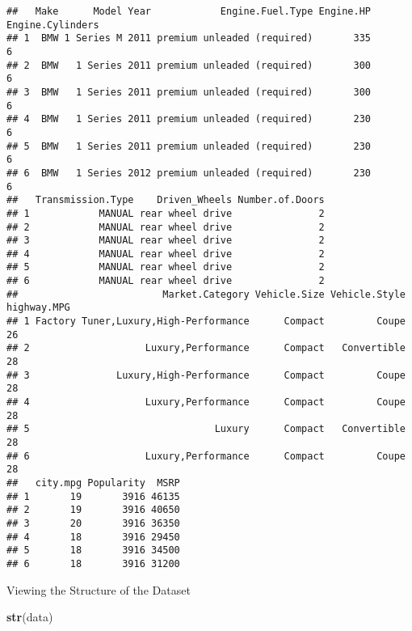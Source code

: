 \documentclass[
]{article}
\newenvironment{Shaded}{\begin{snugshade}}{\end{snugshade}}
\newcommand{\KeywordTok}[1]{\textcolor[rgb]{0.13,0.29,0.53}{\textbf{#1}}}
\newcommand{\NormalTok}[1]{#1}
\begin{document}
\begin{verbatim}
##   Make      Model Year            Engine.Fuel.Type Engine.HP Engine.Cylinders
## 1  BMW 1 Series M 2011 premium unleaded (required)       335                6
## 2  BMW   1 Series 2011 premium unleaded (required)       300                6
## 3  BMW   1 Series 2011 premium unleaded (required)       300                6
## 4  BMW   1 Series 2011 premium unleaded (required)       230                6
## 5  BMW   1 Series 2011 premium unleaded (required)       230                6
## 6  BMW   1 Series 2012 premium unleaded (required)       230                6
##   Transmission.Type    Driven_Wheels Number.of.Doors
## 1            MANUAL rear wheel drive               2
## 2            MANUAL rear wheel drive               2
## 3            MANUAL rear wheel drive               2
## 4            MANUAL rear wheel drive               2
## 5            MANUAL rear wheel drive               2
## 6            MANUAL rear wheel drive               2
##                         Market.Category Vehicle.Size Vehicle.Style highway.MPG
## 1 Factory Tuner,Luxury,High-Performance      Compact         Coupe          26
## 2                    Luxury,Performance      Compact   Convertible          28
## 3               Luxury,High-Performance      Compact         Coupe          28
## 4                    Luxury,Performance      Compact         Coupe          28
## 5                                Luxury      Compact   Convertible          28
## 6                    Luxury,Performance      Compact         Coupe          28
##   city.mpg Popularity  MSRP
## 1       19       3916 46135
## 2       19       3916 40650
## 3       20       3916 36350
## 4       18       3916 29450
## 5       18       3916 34500
## 6       18       3916 31200
\end{verbatim}

Viewing the Structure of the Dataset

\begin{Shaded}
\begin{Highlighting}[]
\KeywordTok{str}\NormalTok{(data)}
\end{Highlighting}
\end{Shaded}
\end{document}
